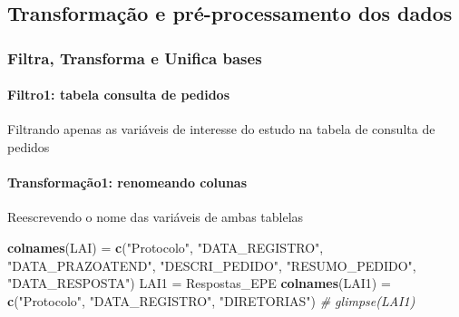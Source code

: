 \documentclass[]{article}
\newenvironment{Shaded}{\begin{snugshade}}{\end{snugshade}}
\newcommand{\CommentTok}[1]{\textcolor[rgb]{0.56,0.35,0.01}{\textit{#1}}}
\newcommand{\DataTypeTok}[1]{\textcolor[rgb]{0.13,0.29,0.53}{#1}}
\newcommand{\KeywordTok}[1]{\textcolor[rgb]{0.13,0.29,0.53}{\textbf{#1}}}
\newcommand{\NormalTok}[1]{#1}
\newcommand{\OperatorTok}[1]{\textcolor[rgb]{0.81,0.36,0.00}{\textbf{#1}}}
\newcommand{\StringTok}[1]{\textcolor[rgb]{0.31,0.60,0.02}{#1}}
\let\oldparagraph\paragraph
\renewcommand{\paragraph}[1]{\oldparagraph{#1}\mbox{}}
\begin{document}
\hypertarget{transformacao-e-pre-processamento-dos-dados}{%
\subsection{Transformação e pré-processamento dos
dados}\label{transformacao-e-pre-processamento-dos-dados}}

\hypertarget{filtra-transforma-e-unifica-bases}{%
\subsubsection{Filtra, Transforma e Unifica
bases}\label{filtra-transforma-e-unifica-bases}}

\hypertarget{filtro1-tabela-consulta-de-pedidos}{%
\paragraph{Filtro1: tabela consulta de
pedidos}\label{filtro1-tabela-consulta-de-pedidos}}

Filtrando apenas as variáveis de interesse do estudo na tabela de
consulta de pedidos

\begin{Shaded}
\end{Shaded}

\hypertarget{transformacao1-renomeando-colunas}{%
\paragraph{Transformação1: renomeando
colunas}\label{transformacao1-renomeando-colunas}}

Reescrevendo o nome das variáveis de ambas tablelas

\begin{Shaded}
\begin{Highlighting}[]
\KeywordTok{colnames}\NormalTok{(LAI) =}\StringTok{ }\KeywordTok{c}\NormalTok{(}\StringTok{"Protocolo"}\NormalTok{, }\StringTok{"DATA_REGISTRO"}\NormalTok{, }\StringTok{"DATA_PRAZOATEND"}\NormalTok{, }\StringTok{"DESCRI_PEDIDO"}\NormalTok{,}
                     \StringTok{"RESUMO_PEDIDO"}\NormalTok{, }\StringTok{"DATA_RESPOSTA"}\NormalTok{)}
\NormalTok{LAI1 =}\StringTok{ }\NormalTok{Respostas_EPE}
\KeywordTok{colnames}\NormalTok{(LAI1) =}\StringTok{ }\KeywordTok{c}\NormalTok{(}\StringTok{"Protocolo"}\NormalTok{, }\StringTok{"DATA_REGISTRO"}\NormalTok{, }\StringTok{"DIRETORIAS"}\NormalTok{)}
\CommentTok{# glimpse(LAI1)}
\end{Highlighting}
\end{Shaded}
\end{document}
